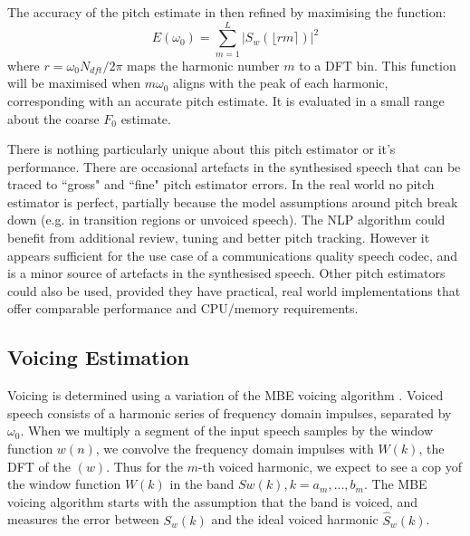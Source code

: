 \documentclass{article}
\begin{document}
The accuracy of the pitch estimate in then refined by maximising the function:
\begin{equation}
\label{eq:pitch_refinement}
E(\omega_0)=\sum_{m=1}^L|S_w(\lfloor r m \rceil)|^2
\end{equation}
where $r=\omega_0 N_{dft}/2 \pi$ maps the harmonic number $m$ to a DFT bin. This function will be maximised when $m \omega_0$ aligns with the peak of each harmonic, corresponding with an accurate pitch estimate.   It is evaluated in a small range about the coarse $F_0$ estimate.

There is nothing particularly unique about this pitch estimator or it's performance. There are occasional artefacts in the synthesised speech that can be traced to ``gross" and ``fine" pitch estimator errors.  In the real world no pitch estimator is perfect, partially because the model assumptions around pitch break down (e.g. in transition regions or unvoiced speech).  The NLP algorithm could benefit from additional review, tuning and better pitch tracking.  However it appears sufficient for the use case of a communications quality speech codec, and is a minor source of artefacts in the synthesised speech. Other pitch estimators could also be used, provided they have practical, real world implementations that offer comparable performance and CPU/memory requirements.

\subsection{Voicing Estimation}

Voicing is determined using a variation of the MBE voicing algorithm \cite{griffin1988multiband}.  Voiced speech consists of a harmonic series of frequency domain impulses, separated by $\omega_0$.  When we multiply a segment of the input speech samples by the window function $w(n)$, we convolve the frequency domain impulses with $W(k)$, the DFT of the $(w)$.  Thus for the $m$-th voiced harmonic, we expect to see a cop yof the window function $W(k)$ in the band $Sw(k), k=a_m,...,b_m$.  The MBE voicing algorithm starts with the assumption that the band is voiced, and measures the error between $S_w(k)$ and the ideal voiced harmonic $\hat{S}_w(k)$.
\end{document}

